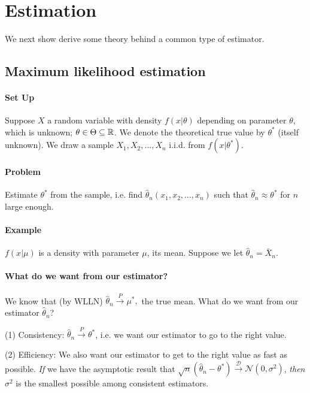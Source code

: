 \documentclass[12pt]{article}\usepackage[]{graphicx}\usepackage[]{color}
\begin{document}
\section{Estimation}
We next show derive some theory behind a common type of estimator.

\subsection{Maximum likelihood estimation}

\paragraph{Set Up} Suppose $X$ a random variable with density $f(x|\theta)$ 
depending on parameter $\theta$, which is unknown; $\theta \in \Theta \subseteq \Bbb R$. We denote the theoretical true value by $\theta^*$ (itself
unknown). We draw a sample $X_1, X_2, \ldots, X_n$ i.i.d. from
$f(x|\theta^*)$.

\paragraph{Problem} Estimate $\theta^*$ from the sample, i.e.
find $\hat \theta_n(x_1, x_2, \ldots, x_n)$ such that $\hat \theta_n \approx \theta^*$ for $n$ large enough.

\paragraph{Example} $f(x|\mu)$ is a density with parameter $\mu$, its mean.
Suppose we let $\hat \theta_n = \bar X_n$. 

\paragraph{What do we want from our estimator?}
We know that (by WLLN) 
$\hat \theta_n \overset{P}{\longrightarrow} \mu^*,$ the true mean. What do we want
from our estimator $\hat \theta_n$?

(1) Consistency: $\hat \theta_n \overset{P}{\longrightarrow} \theta^*$, i.e.
we want our estimator to go to the right value.

(2) Efficiency: We also want our estimator to get to the right value as fast as possible.
\emph{If} we have the asymptotic result that
  $\sqrt n (\hat \theta_n - \theta^*) \overset{ \mathcal D}{\longrightarrow} \mathcal N (0, \sigma^2)$,
\emph{then} $\sigma^2$ is the smallest possible among consistent estimators.
\end{document}
